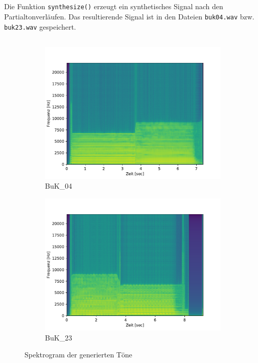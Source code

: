 \subsection{}
Die Funktion \texttt{synthesize()} erzeugt ein synthetisches Signal nach den Partialtonverläufen.
Das resultierende Signal ist in den Dateien \texttt{buk04.wav} bzw. \texttt{buk23.wav} gespeichert.


\subsection{}

\begin{figure}[H]
    \centering
    \begin{subfigure}{.5\textwidth}
        \centering
        \caption{BuK\_04}
        \includegraphics[width=\linewidth]{Figures/buk04_spectrogram}
    \end{subfigure}%
    \begin{subfigure}{.5\textwidth}
        \centering
        \caption{BuK\_23}
        \includegraphics[width=\linewidth]{Figures/buk23_spectrogram}
    \end{subfigure}
    \caption{Spektrogram der generierten Töne}
    \label{fig:spectrogram}
\end{figure}

